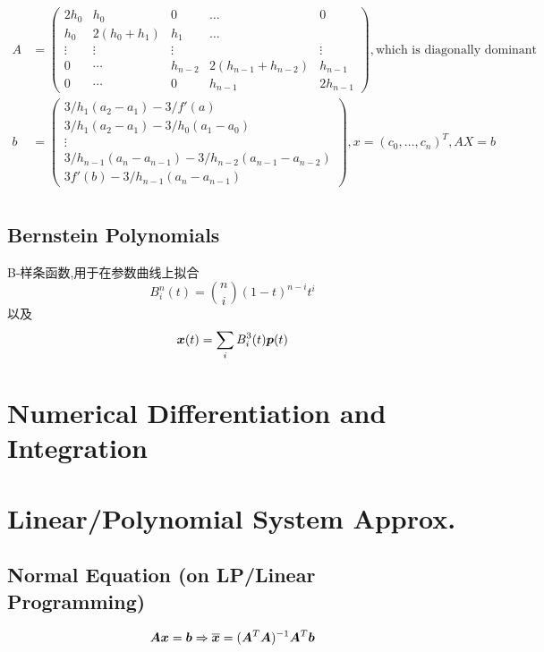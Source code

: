 \documentclass{article}
\begin{document}
$$
    \begin{aligned}
        A & =\left(
        \begin{array}{ccccc}
            2h_0   & h_0        & 0       & \dots              & 0        \\
            h_0    & 2(h_0+h_1) & h_1     & \dots                         \\
            \vdots & \vdots     & \vdots  &                    & \vdots   \\
            0      & \cdots     & h_{n-2} & 2(h_{n-1}+h_{n-2}) & h_{n-1}  \\
            0      & \cdots     & 0       & h_{n-1}            & 2h_{n-1}
        \end{array}
        \right),\text{which is diagonally dominant} \\
        b & =\left(
        \begin{array}{ccccc}
            3/h_1(a_2-a_1)-3/f'(a)                       \\
            3/h_1(a_2-a_1)-3/h_0(a_1-a_0)                       \\
            \vdots                                              \\
            3/h_{n-1}(a_{n}-a_{n-1})-3/h_{n-2}(a_{n-1}-a_{n-2}) \\
            3f'(b)-3/h_{n-1}(a_{n}-a_{n-1})
        \end{array}
        \right), x=(c_0,\dots,c_n)^T, AX=b          \\
    \end{aligned}
$$

\subsection{Bernstein Polynomials}

B-样条函数,用于在参数曲线上拟合
$$
B^n_i(t)=\binom{n}{i}(1-t)^{n-i}t^i
$$
以及
$$
\boldsymbol{x}(t)=\sum_i B^3_i(t)\boldsymbol{p}(t)
$$

\section{Numerical Differentiation and Integration}

\section{Linear/Polynomial System Approx.}

\subsection{Normal Equation (on LP/Linear Programming)}
$$\boldsymbol{A}\boldsymbol{x}=\boldsymbol{b}\Rightarrow \overline{\boldsymbol{x}}=(\boldsymbol{A}^T \boldsymbol{A})^{-1} \boldsymbol{A}^T \boldsymbol{b}$$
\end{document}
